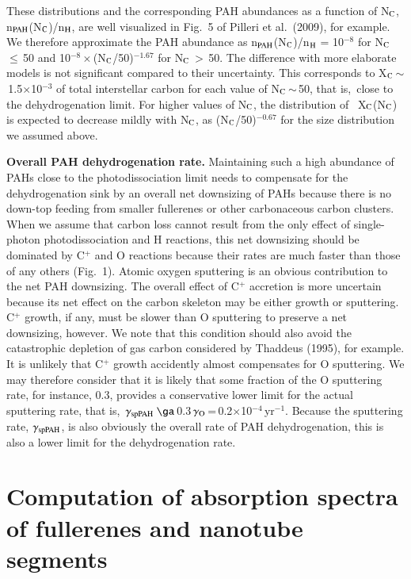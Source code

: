 \documentclass{aa}
\begin{document}
These distributions and the corresponding PAH abundances as a function of N$_{\rm C}$, n$_{\rm PAH}$(N$_{\rm C}$)/n$_{\rm H}$, are well visualized in Fig.\ 5 of Pilleri et al.\ (2009), for example. We therefore  approximate the 
PAH abundance as n$_{\rm PAH}$(N$_{\rm C}$)/n$_{\rm H}$ = 10$^{-8}$ for 
N$_{\rm C}$\,$\le$\,50 and  10$^{-8}\times$(N$_{\rm C}$/50)$^{-1.67}$ for 
N$_{\rm C}$\,$>$\,50. The difference with more elaborate models is not significant compared to their uncertainty. This corresponds to X$_{\rm C}$\,$\sim$\,1.5$\times$10$^{-3}$ of total interstellar carbon for each value 
of  N$_{\rm C}$\,$\sim$\,50, that is,\ close to the dehydrogenation limit.
For higher values of N$_{\rm C}$, the distribution of \ X$_{\rm C}$(N$_{\rm C}$)  is expected to decrease mildly with N$_{\rm C}$, as (N$_{\rm C}$/50)$^{-0.67}$ for the size distribution we assumed above.

{\bf Overall PAH dehydrogenation rate.}
Maintaining such a high abundance of PAHs close to the photodissociation limit needs to compensate for the dehydrogenation sink by an overall net downsizing of PAHs because there is no down-top feeding from smaller fullerenes or other carbonaceous carbon clusters. When we assume that carbon loss cannot 
result from the only effect of single-photon photodissociation and H reactions, this net downsizing should be dominated by C$^+$ and O reactions because their rates are much faster than those of any others (Fig.\ 1).  Atomic oxygen sputtering is an obvious contribution to the net PAH downsizing. The overall effect of C$^+$ accretion is more uncertain because its net effect on the carbon skeleton may be either growth or sputtering.  C$^+$ growth, if any, must be slower than O sputtering to preserve a net downsizing, however. We note that this condition should also avoid the catastrophic depletion 
of gas carbon considered by Thaddeus (1995), for example. It is unlikely that  C$^+$ growth accidently almost compensates  for O sputtering. We may therefore consider that it is likely that some fraction of the O sputtering rate, 
for instance, 0.3, provides a conservative lower limit for the actual sputtering rate, that is,\ $\gamma_{\rm spPAH}$\,$\ga$\,0.3\,$\gamma_{\rm O}$\,=\,0.2$\times$10$^{-4}$\,yr$^{-1}$. Because the sputtering rate, $\gamma_{\rm spPAH}$, is also obviously the overall rate of PAH dehydrogenation, this is also a lower limit for the dehydrogenation rate. 


\section{Computation of absorption spectra of fullerenes and nanotube segments}
\end{document}
